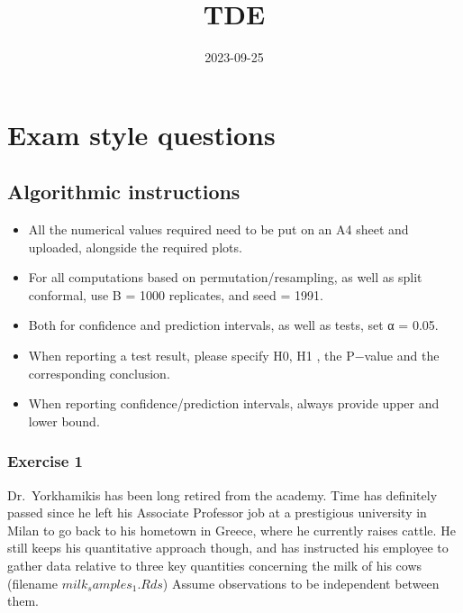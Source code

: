 \documentclass[
]{article}
\title{TDE}
\author{}
\date{\vspace{-2.5em}2023-09-25}
\providecommand{\tightlist}{%
  \setlength{\itemsep}{0pt}\setlength{\parskip}{0pt}}
\begin{document}
\maketitle

\hypertarget{exam-style-questions}{%
\section{Exam style questions}\label{exam-style-questions}}

\hypertarget{algorithmic-instructions}{%
\subsection{Algorithmic instructions}\label{algorithmic-instructions}}

\begin{itemize}
\tightlist
\item
  All the numerical values required need to be put on an A4 sheet and
  uploaded, alongside the required plots.
\item
  For all computations based on permutation/resampling, as well as split
  conformal, use B = 1000 replicates, and seed = 1991.
\item
  Both for confidence and prediction intervals, as well as tests, set α
  = 0.05.
\item
  When reporting a test result, please specify H0, H1 , the P−value and
  the corresponding conclusion.
\item
  When reporting confidence/prediction intervals, always provide upper
  and lower bound.
\end{itemize}

\hypertarget{exercise-1}{%
\subsubsection{Exercise 1}\label{exercise-1}}

Dr.~Yorkhamikis has been long retired from the academy. Time has
definitely passed since he left his Associate Professor job at a
prestigious university in Milan to go back to his hometown in Greece,
where he currently raises cattle. He still keeps his quantitative
approach though, and has instructed his employee to gather data relative
to three key quantities concerning the milk of his cows (filename
\(milk_samples_1.Rds\)) Assume observations to be independent between
them.
\end{document}

